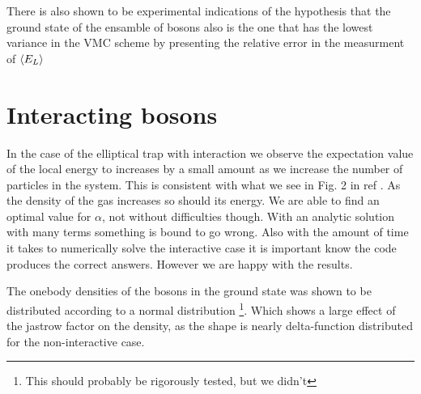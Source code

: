 There is also shown to be experimental indications of the hypothesis that the ground state of the ensamble of bosons also is  the one that has the lowest variance in the VMC scheme by presenting the relative error in the measurment of $\langle E_L \rangle$  


\section{Interacting bosons}
In the case of the elliptical trap with interaction we observe the expectation value of the local energy to increases by a small amount as we increase the number of particles in the system. This is consistent with what we see in Fig. 2 in ref \cite{VMC}. As the density of the gas increases so should its energy. 
We are able to find an optimal value for $\alpha$, not without difficulties though. With an analytic solution with many terms something is bound to go wrong. Also with the amount of time it takes to numerically solve the interactive case it is important know the code produces the correct answers. However we are happy with the results.

The onebody densities of the bosons in the ground state was shown to be distributed according to a normal distribution  \footnote{This should probably be rigorously tested, but we didn't}. Which shows a large effect of the jastrow factor on the density, as the shape is nearly delta-function distributed for the non-interactive case. 
